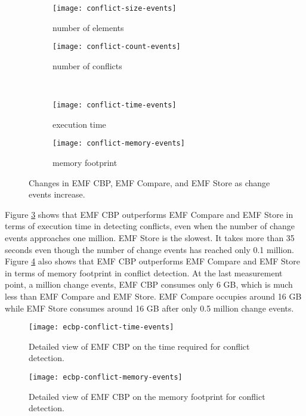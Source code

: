 \begin{figure*}[ht]
  \centering
  \begin{subfigure}[t]{0.490\linewidth}
    \texttt{[image: conflict-size-events]}
    \caption{number of elements}
    \label{fig:conflict-size-events}
  \end{subfigure}
  \hfill
  \begin{subfigure}[t]{0.490\linewidth}
    \texttt{[image: conflict-count-events]}
    \caption{number of conflicts}
    \label{fig:conflict-count-events}
  \end{subfigure}
  \\
  \begin{subfigure}[t]{0.490\linewidth}
    \texttt{[image: conflict-time-events]}
    \caption{execution time}
    \label{fig:conflict-time-events}
  \end{subfigure}
  \hfill
  \begin{subfigure}[t]{0.490\linewidth}
    \texttt{[image: conflict-memory-events]}
    \caption{memory footprint}
    \label{fig:conflict-memory-events}
  \end{subfigure}
  \caption{Changes in EMF CBP, EMF Compare, and EMF Store as change events increase.}
  \label{fig:conflict_events}
\end{figure*}

Figure \ref{fig:conflict-time-events} shows that EMF CBP outperforms EMF Compare and EMF Store in terms of execution time in detecting conflicts, even when the number of change events approaches one million. EMF Store is the slowest. It takes more than 35 seconds even though the number of change events has reached only 0.1 million. Figure \ref{fig:conflict-memory-events} also shows that EMF CBP outperforms EMF Compare and EMF Store in terms of memory footprint in conflict detection. At the last measurement point, a million change events, EMF CBP consumes only 6 GB, which is much less than EMF Compare and EMF Store. EMF Compare occupies around 16 GB while EMF Store consumes around 16 GB after only 0.5 million change events.

\begin{figure*}[]
  \centering
  \begin{minipage}[t]{0.490\textwidth}
    \texttt{[image: ecbp-conflict-time-events]}
    \caption{Detailed view of EMF CBP on the time required for conflict detection.}
    \label{fig:ecbp-conflict-time-events}
  \end{minipage}
  \hfill
  \begin{minipage}[t]{0.490\textwidth}
    \texttt{[image: ecbp-conflict-memory-events]}
    \caption{Detailed view of EMF CBP on the memory footprint for conflict detection.}
    \label{fig:ecbp-conflict-memory-events}
  \end{minipage}
\end{figure*}

